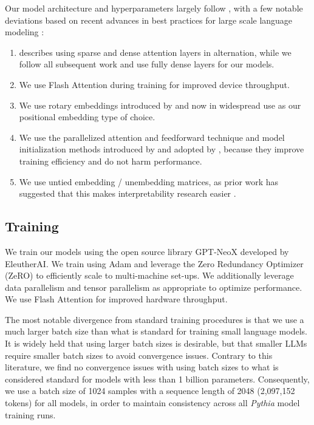 \documentclass{article}
\theoremstyle{plain}
\theoremstyle{definition}
\theoremstyle{remark}
\begin{document}
Our model architecture and hyperparameters largely follow \citet{brown2020language}, with a few notable deviations based on recent advances in best practices for large scale language modeling \citep{black2022gpt,chowdhery2022palm,zeng2022glm}:
\begin{enumerate}
    \item \citet{brown2020language} describes using sparse and dense attention layers in alternation, while we follow all subsequent work and use fully dense layers for our models.
    \item We use Flash Attention \citep{dao2022flashattention} during training for improved device throughput.
    \item We use rotary embeddings introduced by \citet{su2021roformer} and now in widespread use \citep{black2022gpt,chowdhery2022palm,zeng2022glm} as our positional embedding type of choice.
    \item We use the parallelized attention and feedforward technique and model initialization methods introduced by \citet{gpt-j} and adopted by \citep{black2022gpt,chowdhery2022palm}, because they improve training efficiency and do not harm performance.
    \item We use untied embedding / unembedding matrices, as prior work has suggested that this makes interpretability research easier \citep{belrose2023eliciting}.
\end{enumerate}

\subsection{Training}

We train our models using the open source library GPT-NeoX \citep{gpt-neox-library} developed by EleutherAI. We train using Adam and leverage the Zero Redundancy Optimizer (ZeRO) \citep{rajbhandari2020zero} to efficiently scale to multi-machine set-ups. We additionally leverage data parallelism \citep{goyal2017dataparallel} and tensor parallelism \citep{megatron-lm} as appropriate to optimize performance. We use Flash Attention \citep{dao2022flashattention} for improved hardware throughput.

The most notable divergence from standard training procedures is that we use a much larger batch size than what is standard for training small language models. It is widely held \citep{mccandlish2018empirical,zhang2019algorithmic,kaplan2020scaling,brown2020language,hoffmann2022training} that using larger batch sizes is desirable, but that smaller LLMs require smaller batch sizes to avoid convergence issues. Contrary to this literature, we find no convergence issues with using batch sizes  to  what is considered standard for models with less than 1 billion parameters. Consequently, we use a batch size of 1024 samples with a sequence length of 2048 (2,097,152 tokens) for all models, in order to maintain consistency across all \textit{Pythia} model training runs.
\end{document}
